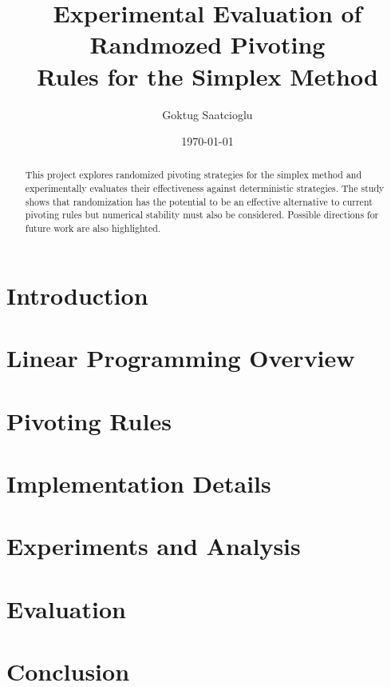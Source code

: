 \documentclass [12pt]{article}
\begin{document}
\title{Experimental Evaluation of Randmozed Pivoting\\Rules for the Simplex Method}
\author{Goktug Saatcioglu}
\date{\today}
\maketitle

\begin{abstract}
This project explores randomized pivoting strategies for the simplex method and experimentally evaluates their effectiveness against deterministic strategies. The study shows that randomization has the potential to be an effective alternative to current pivoting rules but numerical stability must also be considered. Possible directions for future work are also highlighted.
\end{abstract}

\bigskip

\section{Introduction}
\label{sec:intro}

\section{Linear Programming Overview}
\label{sec:lp}

\section{Pivoting Rules}
\label{sec:pivot}

\section{Implementation Details}
\label{sec:implementation}

\section{Experiments and Analysis}
\label{sec:experiments}

\section{Evaluation}
\label{sec:eval}

\section{Conclusion}
\label{sec:conc}

\newpage
\printbibliography[heading=bibnumbered,title={References}]
\end{document}
